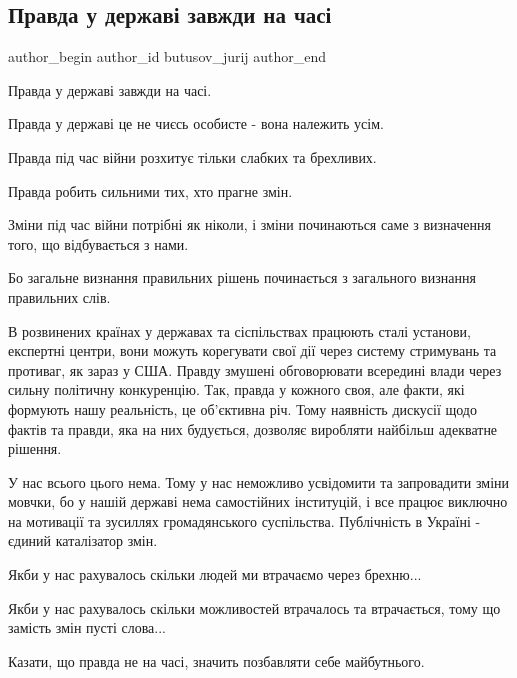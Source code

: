  
 
 
 
 

\subsection{Правда у державі завжди на часі}
\label{sec:02_12_2022.fb.butusov_jurij.1.pravda_u_derzhav__za}

\ifcmt
 author_begin
   author_id butusov_jurij
 author_end
\fi

Правда у державі завжди на часі. 

Правда у державі це не чиєсь особисте - вона належить усім.

Правда під час війни розхитує тільки слабких та брехливих. 

Правда робить сильними тих, хто прагне змін.

Зміни під час війни потрібні як ніколи, і зміни починаються саме з  визначення
того, що відбувається з нами. 

Бо загальне визнання правильних рішень починається з загального визнання
правильних слів.  

В розвинених країнах у державах та сіспільствах працюють сталі установи,
експертні центри,  вони можуть корегувати свої дії через систему стримувань та
противаг, як зараз у США. Правду змушені обговорювати всередині влади через
сильну політичну конкуренцію. Так, правда у кожного своя, але факти, які
формують нашу реальність, це об'єктивна річ. Тому наявність дискусії щодо
фактів та правди, яка на них будується, дозволяє виробляти найбільш адекватне
рішення.  

У нас всього цього нема. Тому у нас неможливо усвідомити та запровадити зміни
мовчки, бо у нашій державі нема самостійних інституцій, і все працює виключно
на мотивації та зусиллях громадянського суспільства. Публічність в Україні -
єдиний каталізатор змін.

Якби у нас рахувалось скільки людей ми втрачаємо через брехню...

Якби у нас рахувалось скільки можливостей втрачалось та втрачається, тому що
замість змін пусті слова...

Казати, що правда не на часі, значить позбавляти себе майбутнього.

